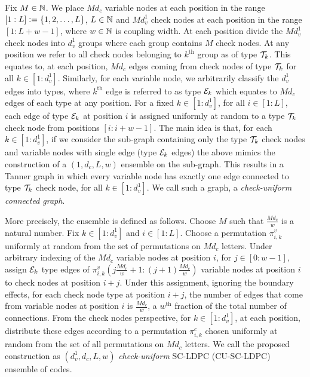 \documentclass[journal,twocolumn]{IEEEtran}
\begin{document}
Fix $M\in \mathbb{N}$. We place $M d_{c}$ variable nodes at each position in the range $[1: L]\mathrel{\mathop:}=\{1,2,\ldots ,L\}$, $L\in\mathbb{N}$ and $Md_{v}^{1}$ check nodes at each position in the range $[1 : L+w-1]$, where $w\in \mathbb{N}$ is coupling width. At each position divide the $Md_{v}^{1}$ check nodes into $d_{v}^{1}$ groups where each group contains $M$ check nodes. At any position we refer to all check nodes belonging to $k^{\text{th}}$ group as of type $\mathcal{T}_{k}$. This equates to, at each position,  $Md_{c}$ edges coming from check nodes of type $\mathcal{T}_{k}$ for all $k\in [1:d_{v}^{1}]$. Similarly, for each variable node, we arbitrarily classify the $d_{v}^{1}$ edges into types, where $k^{\text{th}}$ edge is referred to as type $\mathcal{E}_{k}$ which equates to $Md_{c}$ edges of each type at any position. For a fixed $k \in [1 : d_{v}^{1}]$, for all $i \in [1 : L]$, each edge of type $\mathcal{E}_{k}$ at position $i$ is assigned uniformly at random to a type $\mathcal{T}_{k}$ check node from positions $[i : i+w-1]$. The main idea is that, for each $k\in [1:d_{v}^{1}]$, if we consider the sub-graph containing only the type $\mathcal{T}_{k}$ check nodes and variable nodes with single edge (type $\mathcal{E}_{k}$ edges) the above mimics the construction of a $(1,d_{c},L,w)$ ensemble \cite{KudekarUrbanke11} on the sub-graph. This results in a Tanner graph in which every variable node has exactly one edge connected to type $\mathcal{T}_{k}$ check node, for all $k \in [1: d_{v}^{1}]$. We call such a graph, a \textit{check-uniform connected graph}.

More precisely, the ensemble is defined as follows. Choose $M$ such that $\frac{Md_{c}}{w}$ is a natural number. Fix $k\in[1:d_{v}^{1}]$ and $i\in[1:L]$. Choose a permutation $\pi^{v}_{i,k}$ uniformly at random from the set of permutations on $Md_{c}$ letters. Under arbitrary indexing of the $Md_{c}$ variable nodes at position $i$, for $j\in [0:w-1]$, assign $\mathcal{E}_{k}$ type edges of $\pi^{v}_{i,k}\left(j\frac{Md_{c}}{w}+1:(j+1)\frac{Md_{c}}{w}\right)$ variable nodes at position $i$ to check nodes at position $i+j$. Under this assignment, ignoring the boundary effects, for each check node type at position $i+j$, the number of edges that come from variable nodes at position $i$ is $\frac{Md_{c}}{w}$, a $w^{\text{th}}$ fraction of the total number of connections. From the check nodes perspective, for $k\in[1:d_{v}^{1}]$, at  each position, distribute these edges according to a permutation $\pi^{c}_{i,k}$ chosen uniformly at random from the set of all permutations on $Md_{c}$ letters. We call the proposed construction as $(d_{v}^{1},d_{c},L,w)$ \textit{check-uniform} SC-LDPC (CU-SC-LDPC) ensemble of codes.  
\end{document}
